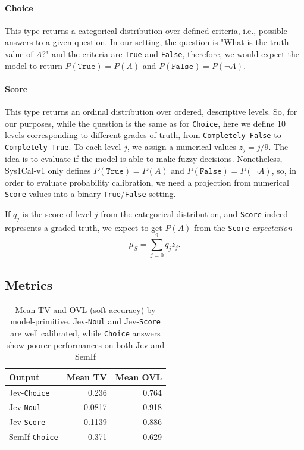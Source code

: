 \documentclass[twoside]{article}
\begin{document}
\paragraph{Choice} This type returns a categorical distribution over defined criteria, i.e., possible answers to a given question. In our setting, the question is "What is the truth value of $A$?" and the criteria are \texttt{True} and \texttt{False}, therefore, we would expect the model to return $P(\texttt{True})=P(A)$ and $P(\texttt{False})=P(\neg A)$.

\paragraph{Score} This type returns an ordinal distribution over ordered, descriptive levels. So, for our purposes, while the question is the same as for \texttt{Choice}, here we define 10 levels corresponding to different grades of truth, from \texttt{Completely False} to \texttt{Completely True}. To each level $j$, we assign a numerical values $z_j=j/9$. The idea is to evaluate if the model is able to make fuzzy decisions.
Nonetheless, Sys1Cal-v1 only defines $P(\texttt{True})=P(A)$ and $P(\texttt{False})=P(\neg A)$, so, in order to evaluate probability calibration, we need a projection from numerical \texttt{Score} values into a binary \texttt{True}/\texttt{False} setting.

If $q_j$ is the score of level $j$ from the categorical distribution, and \texttt{Score} indeed represents a graded truth, we expect to get $P(A)$ from the \texttt{Score} \emph{expectation}
\begin{equation} \label{eq:score_exp}
    \mu_S=\sum_{j=0}^9 q_j z_j.
\end{equation}



\subsection{Metrics}

\begin{table}[t]
\caption{Mean TV and OVL (soft accuracy) by model-primitive. Jev-\texttt{Noul} and Jev-\texttt{Score} are well calibrated, while \texttt{Choice} answers show poorer performances on both Jev and SemIf}
\label{tab:main}
\begin{center}
\begin{tabular}{lrr}
\toprule
Output & Mean TV & Mean OVL \\
\midrule
Jev-\texttt{Choice} & 0.236 & 0.764 \\
Jev-\texttt{Noul} & 0.0817 & 0.918 \\
Jev-\texttt{Score} & 0.1139 & 0.886 \\
SemIf-\texttt{Choice} & 0.371 & 0.629 \\
\bottomrule
\end{tabular}
\end{center}
\end{table}
\end{document}
